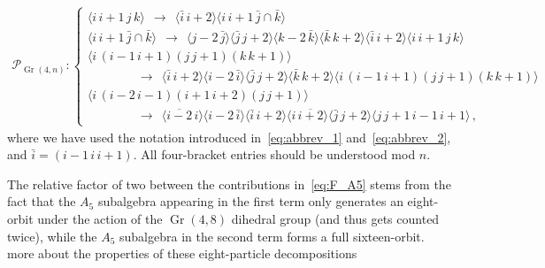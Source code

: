 \documentclass[11pt]{article}
\DeclareMathOperator{\Gr}{Gr}
\def\ket#1{\langle #1 \rangle}
\begin{document}
\vspace{-2.6cm}
\begin{align} 
  \mathcal{P}_{\Gr(4,n)} :  \begin{cases} 
	\ket{i \, i{+}1 \, j \, k} \ \ \to\ \ \ket{\bar{i} \, i{+}2}\ket{i \, i{+}1 \, \bar{j}\cap\bar{k}} \\
	\ket{i \, i{+}1 \, \bar{j}\cap\bar{k}} \ \ \to \ \ \ket{j{-}2 \, \bar{j}} \ket{\bar{j} \, j{+}2} \ket{k{-}2 \, \bar{k}} \ket{\bar{k} \, k{+}2} \ket{\bar{i} \, i{+}2}\ket{i \, i{+}1 \, j \, k} \\
	\ket{i \, (i{-}1 \, i{+}1)(j \, j{+}1)(k \,k{+}1)} \\ 
	\qquad \qquad \to \ \ \ket{\bar{i} \, i{+}2} \ket{i{-}2 \, \bar{i}} \ket{\bar{j} \, j{+}2} \ket{\bar{k} \, k{+}2} \ket{i \, (i{-}1 \, i{+}1)(j \, j{+}1)(k \, k{+}1)} \\
	\ket{i \, (i{-}2 \, i{-}1)(i{+}1 \, i{+}2)(j \, j{+}1)} \\ 
	\qquad \qquad \to \ \ \ket{\overline{i{-}2} \, i} \ket{i{-}2 \, \bar{i}} \ket{\bar{i} \, i{+}2} \ket{i \, \overline{i{+}2}} \ket{\bar{j} \, j{+}2} \ket{j \, j{+}1 \, i{-}1\, i{+}1}\, ,
  \end{cases} \nonumber
\end{align}
where we have used the notation introduced in~\eqref{eq:abbrev_1} and~\eqref{eq:abbrev_2}, and $\bar{i}=(i{-}1\,i\,i{+}1)$. All four-bracket entries should be understood mod $n$. 

The relative factor of two between the contributions in~\eqref{eq:F_A5} stems from the fact that the $A_5$ subalgebra appearing in the first term only generates an eight-orbit under the action of the $\Gr(4,8)$ dihedral group (and thus gets counted twice), while the $A_5$ subalgebra in the second term forms a full sixteen-orbit. {\color{red} more about the properties of these eight-particle decompositions} 
\end{document}
